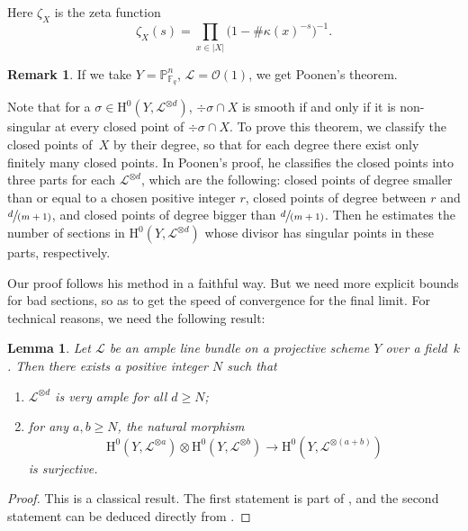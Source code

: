 \documentclass[11pt]{article}
\numberwithin{equation}{section}
\newcommand{\spfrac}[2]{\sfrac{#1}{(#2)}}
\newenvironment{enumeratei}
{\bgroup\def\theenumi{\roman{enumi}}\def\theenumii{\arabic{enumii}}\begin{enumerate}}
{\end{enumerate}\egroup}
\theoremstyle{plain}
\newtheorem{lem}[thm]{Lemma}
\theoremstyle{definition}
\newtheorem*{rmq}{Remark}
\newcommand{\ho}{\mathrm{H}}
\newcommand{\li}{\mathcal{L}}
\newcommand{\pr}{\mathbb{P}}
\newcommand{\F}{\mathbb{F}}
\begin{document}
Here $\zeta_X$ is the zeta function
\[
\zeta_X(s)=\prod_{x\in |X|}\big(1-\#\kappa(x)^{-s}\big)^{-1}.
\]

\begin{rmq}
If we take $Y=\pr^n_{\F_q}$, $\li=\mathcal{O}(1)$, we get Poonen's theorem.
\end{rmq}

Note that for a $\sigma\in \ho^0(Y, \mathcal{L}^{\otimes{d}})$, $\div \sigma\cap X$ is smooth if and only if it is non-singular at every closed point of $\div \sigma\cap X$. To prove this theorem, we classify the closed points of~$X$ by their degree, so that for each degree there exist only finitely many closed points. In Poonen's proof, he classifies the closed points into three parts for each $\li^{\otimes d}$, which are the following: closed points of degree smaller than or equal to a chosen positive integer $r$, closed points of degree between $r$ and $\spfrac{d}{m+1}$, and closed points of degree bigger than $\spfrac{d}{m+1}$. Then he estimates the number of sections in $\ho^0(Y, \mathcal{L}^{\otimes d})$ whose divisor has singular points in these parts, respectively.

Our proof follows his method in a faithful way. But we need more explicit bounds for bad sections, so as to get the speed of convergence for the final limit. For technical reasons, we need the following result:
\begin{lem}\label{ample}
Let $\li$ be an ample line bundle on a projective scheme $Y$ over a field~$k$. Then there exists a positive integer $N$ such that
\begin{enumeratei}
\item $\li^{\otimes d}$ is very ample for all $d\geq N$;
\item for any $a, b\geq N$, the natural morphism
\[
\ho^0(Y,\li^{\otimes a})\otimes \ho^0(Y,\li^{\otimes b})\to \ho^0(Y,\li^{\otimes (a+b)})
\]
is surjective.
\end{enumeratei}
\end{lem}
\begin{proof}
This is a classical result. The first statement is part of \cite[Th.\,1.2.6]{La04}, and the second statement can be deduced directly from \cite[Th.\,1.8.3]{La04}.
\end{proof}
\end{document}
